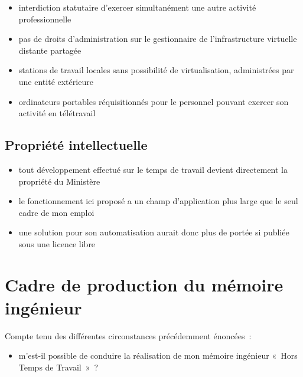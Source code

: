 \documentclass[10pt]{article}
\newenvironment{itmz}{\begin{itemize}
\setlength{\itemsep}{0em}
}{\end{itemize}}
\begin{document}
\begin{itmz}
\item{interdiction statutaire d’exercer simultanément une autre activité professionnelle}
\item{pas de droits d’administration sur le gestionnaire de l’infrastructure virtuelle distante partagée}
\item{stations de travail locales sans possibilité de virtualisation, administrées par une entité extérieure}
\item{ordinateurs portables réquisitionnés pour le personnel pouvant exercer son activité en télétravail}
\end{itmz}

\subsection{Propriété intellectuelle}

\begin{itmz}
\item{tout développement effectué sur le temps de travail devient directement la propriété du Ministère}
\item{le fonctionnement ici proposé a un champ d’application plus large que le seul cadre de mon emploi}
\item{une solution pour son automatisation aurait donc plus de portée si publiée sous une licence libre}
\end{itmz}

\section{Cadre de production du mémoire ingénieur}

Compte tenu des différentes circonstances précédemment énoncées :
\begin{itmz}
\item{m’est-il possible de conduire la réalisation de mon mémoire ingénieur « Hors Temps de Travail » ?}
\end{itmz}
\end{document}
